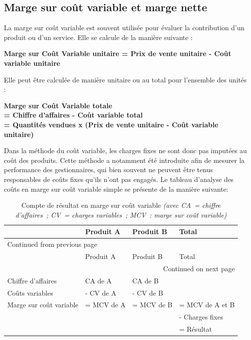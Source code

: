 \documentclass{kaobook}
\begin{document}
\subsection{Marge sur coût variable et marge nette}
\label{sec:org2535bcf}
La marge sur coût variable est souvent utilisée pour évaluer la contribution d'un produit ou d'un service. Elle se calcule de la manière suivante :\\
\begin{center}
\textbf{Marge sur Coût Variable unitaire = Prix de vente unitaire - Coût variable unitaire}\\
\end{center}
Elle peut être calculée de manière unitaire ou au total pour l'ensemble des unités :\\
\begin{center}
\textbf{Marge sur Coût Variable totale}\\
\textbf{= Chiffre d'affaires - Coût variable total}\\
\textbf{= Quantités vendues x (Prix de vente unitaire - Coût variable unitaire)}\\
\end{center}
Dans la méthode du coût variable, les charges fixes ne sont donc pas imputées au coût des produits. Cette méthode a notamment été introduite afin de mesurer la performance des gestionnaires, qui bien souvent ne peuvent être tenus responsables de coûts fixes qu'ils n'ont pas engagés. Le tableau d'analyse des coûts en marge sur coût variable simple se présente de la manière suivante:\\
\begin{longtable}{llll}
\caption{Compte de résultat en marge sur coût variable \emph{(avec CA = chiffre d'affaires ; CV = charges variables ; MCV : marge sur coût variable)}}
\\
 & Produit A & Produit B & Total\\
\hline
\endfirsthead
\multicolumn{4}{l}{Continued from previous page} \\
\hline

 & Produit A & Produit B & Total \\

\hline
\endhead
\hline\multicolumn{4}{r}{Continued on next page} \\
\endfoot
\endlastfoot
\hline
Chiffre d'affaires & CA de A & CA de B & \\
Coûts variables & - CV de A & - CV de B & \\
Marge sur coût variable & = MCV de A & = MCV de B & = MCV de A et B\\
 &  &  & - Charges fixes\\
 &  &  & = Résultat\\
\end{longtable}
\end{document}
